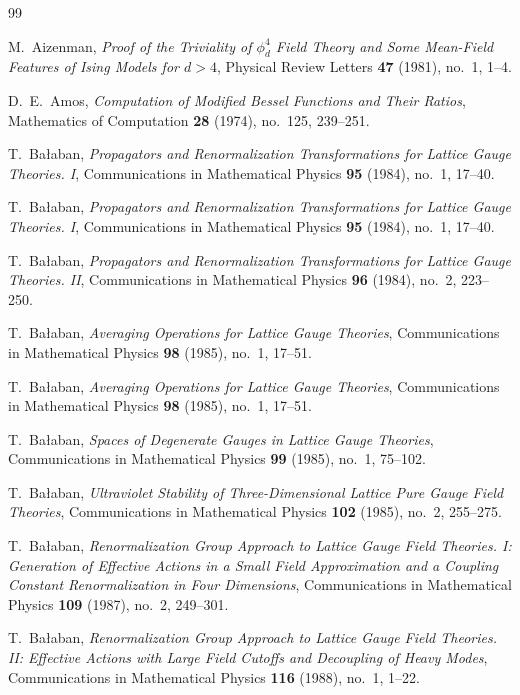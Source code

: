 \begin{thebibliography}{99}

M.~Aizenman,
\textit{Proof of the Triviality of $\phi_d^4$ Field Theory and Some Mean-Field Features of Ising Models for $d > 4$},
Physical Review Letters \textbf{47} (1981), no.~1, 1--4.

D.~E.~Amos,
\textit{Computation of Modified Bessel Functions and Their Ratios},
Mathematics of Computation \textbf{28} (1974), no.~125, 239--251.

T.~Ba{\l}aban,
\textit{Propagators and Renormalization Transformations for Lattice Gauge Theories. I},
Communications in Mathematical Physics \textbf{95} (1984), no.~1, 17--40.

T.~Ba{\l}aban,
\textit{Propagators and Renormalization Transformations for Lattice Gauge Theories. I},
Communications in Mathematical Physics \textbf{95} (1984), no.~1, 17--40.

T.~Ba{\l}aban,
\textit{Propagators and Renormalization Transformations for Lattice Gauge Theories. II},
Communications in Mathematical Physics \textbf{96} (1984), no.~2, 223--250.

T.~Ba{\l}aban,
\textit{Averaging Operations for Lattice Gauge Theories},
Communications in Mathematical Physics \textbf{98} (1985), no.~1, 17--51.

T.~Ba{\l}aban,
\textit{Averaging Operations for Lattice Gauge Theories},
Communications in Mathematical Physics \textbf{98} (1985), no.~1, 17--51.

T.~Ba{\l}aban,
\textit{Spaces of Degenerate Gauges in Lattice Gauge Theories},
Communications in Mathematical Physics \textbf{99} (1985), no.~1, 75--102.

T.~Ba{\l}aban,
\textit{Ultraviolet Stability of Three-Dimensional Lattice Pure Gauge Field Theories},
Communications in Mathematical Physics \textbf{102} (1985), no.~2, 255--275.

T.~Ba{\l}aban,
\textit{Renormalization Group Approach to Lattice Gauge Field Theories. I: Generation of Effective Actions in a Small Field Approximation and a Coupling Constant Renormalization in Four Dimensions},
Communications in Mathematical Physics \textbf{109} (1987), no.~2, 249--301.

T.~Ba{\l}aban,
\textit{Renormalization Group Approach to Lattice Gauge Field Theories. II: Effective Actions with Large Field Cutoffs and Decoupling of Heavy Modes},
Communications in Mathematical Physics \textbf{116} (1988), no.~1, 1--22.


\end{thebibliography}
